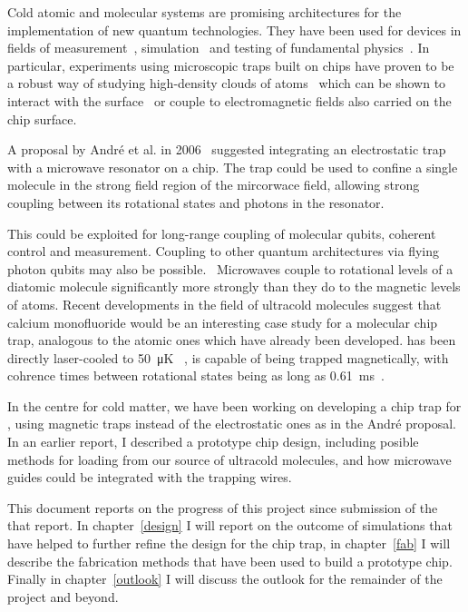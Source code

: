 Cold atomic and molecular systems are promising architectures for the
implementation of new quantum technologies. They have been used for devices in
fields of measurement~\cite{PhysRevLett.120.103201}, simulation~\cite{Gross995}
and testing of fundamental physics~\cite{DeMille990}.  In particular,
experiments using microscopic traps built on chips have proven to be a robust
way of studying high-density clouds of atoms~\cite{Reichel1999, Ott2001} which
can be shown to interact with the surface~\cite{FOLMAN2002263} or couple to electromagnetic
fields also carried on the chip surface.~\cite{Treutlein2008, Sewell_2010}
%

A proposal by Andr\'e et al. in 2006~\cite{Andre2006} suggested integrating an
electrostatic trap with a microwave resonator on a chip. The trap could be used
to confine a single molecule in the strong field region of the mircorwace
field, allowing strong coupling between its rotational states and photons in
the resonator.


This could be exploited for long-range coupling of molecular
qubits, coherent control and measurement. Coupling to other quantum
architectures via flying photon qubits may also be
possible.~\cite{PhysRevLett.92.063601}
Microwaves couple to rotational levels of a diatomic molecule
significantly more strongly than they do to the magnetic levels of atoms.
Recent developments in the field of ultracold molecules suggest that calcium
monofluoride would be an interesting case study for a molecular chip trap,
analogous to the atomic ones which have already been developed. \CaF{} has been
directly laser-cooled to \SI{50}{\micro\kelvin} ~\cite{Truppe2017}, is capable of being
trapped magnetically, with cohrence times between rotational states
being as long as
\SI{0.61}{\milli\second}~\cite{Blackmore_2018}. 

In the centre for cold matter, we have been working on developing a chip trap
for \CaF{}, using magnetic traps instead of the electrostatic ones as in the
Andr\'e proposal. In an earlier report, I described a prototype chip design,
including posible methods for loading from our source of ultracold molecules,
and how microwave guides could be integrated with the trapping wires.

This document reports on the progress of this project since submission of the
that report.  In chapter~\ref{design} I will report on the outcome of
simulations that have helped to further refine the design for the chip trap, in
chapter~\ref{fab} I will describe the fabrication methods that have been used
to build a prototype chip. Finally in chapter~\ref{outlook} I will discuss the
outlook for the remainder of the project and beyond.

